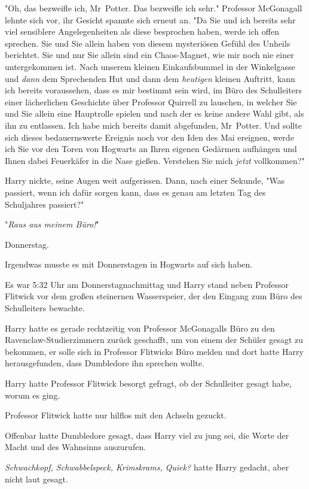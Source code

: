 {"Oh, das bezweifle ich, Mr~Potter. Das bezweifle ich sehr." Professor McGonagall lehnte sich vor, ihr Gesicht spannte sich erneut an. "Da Sie und ich bereits sehr viel sensiblere Angelegenheiten als diese besprochen haben, werde ich offen sprechen. Sie und Sie allein haben von diesem mysteriösen Gefühl des Unheils berichtet. Sie und nur Sie allein sind ein Chaos-Magnet, wie mir noch nie einer untergekommen ist. Nach unserem kleinen Einkaufsbummel in der Winkelgasse und \emph{dann} dem Sprechenden Hut und dann dem \emph{heutigen} kleinen Auftritt, kann ich bereits voraussehen, dass es mir bestimmt sein wird, im Büro des Schulleiters einer lächerlichen Geschichte über Professor Quirrell zu lauschen, in welcher Sie und Sie allein eine Hauptrolle spielen und nach der es keine andere Wahl gibt, als ihn zu entlassen. Ich habe mich bereits damit abgefunden, Mr~Potter. Und sollte sich dieses bedauernswerte Ereignis noch vor den Iden des Mai ereignen, werde ich Sie vor den Toren von Hogwarts an Ihren eigenen Gedärmen aufhängen und Ihnen dabei Feuerkäfer in die Nase gießen. Verstehen Sie mich \emph{jetzt} vollkommen?"

Harry nickte, seine Augen weit aufgerissen. Dann, nach einer Sekunde, "Was passiert, wenn ich dafür sorgen kann, dass es genau am letzten Tag des Schuljahres passiert?"

"\emph{Raus aus meinem Büro!}"

\later

Donnerstag.

Irgendwas musste es mit Donnerstagen in Hogwarts auf sich haben.

Es war 5:32 Uhr am Donnerstagnachmittag und Harry stand neben Professor Flitwick vor dem großen steinernen Wasserspeier, der den Eingang zum Büro des Schulleiters bewachte.

Harry hatte es gerade rechtzeitig von Professor McGonagalls Büro zu den Ravenclaw-Studierzimmern zurück geschafft, um von einem der Schüler gesagt zu bekommen, er solle sich in Professor Flitwicks Büro melden und dort hatte Harry herausgefunden, dass Dumbledore ihn sprechen wollte.

Harry hatte Professor Flitwick besorgt gefragt, ob der Schulleiter gesagt habe, worum es ging.

Professor Flitwick hatte nur hilflos mit den Achseln gezuckt.

Offenbar hatte Dumbledore gesagt, dass Harry viel zu jung sei, die Worte der Macht und des Wahnsinns auszurufen.

\emph{Schwachkopf, Schwabbelspeck, Krimskrams, Quiek?} hatte Harry gedacht, aber nicht laut gesagt.

}
